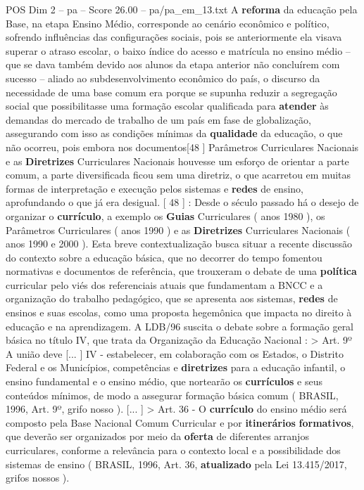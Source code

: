 \begin{textsample}{POS Dim 2 – pa – Score 26.00 – pa/pa\_em\_13.txt}
A \textbf{reforma} da educação pela Base, na etapa Ensino Médio, corresponde ao cenário econômico e político, sofrendo influências das configurações sociais, pois se anteriormente ela visava superar o atraso escolar, o baixo índice do acesso e matrícula no ensino médio – que se dava também devido aos alunos da etapa anterior não concluírem com sucesso – aliado ao subdesenvolvimento econômico do país, o discurso da necessidade de uma base comum era porque se supunha reduzir a segregação social que possibilitasse uma formação escolar qualificada para \textbf{atender} às demandas do mercado de trabalho de um país em fase de globalização, assegurando com isso as condições mínimas da \textbf{qualidade} da educação, o que não ocorreu, pois embora nos documentos[48 ] Parâmetros Curriculares Nacionais e as \textbf{Diretrizes} Curriculares Nacionais houvesse um esforço de orientar a parte comum, a parte diversificada ficou sem uma diretriz, o que acarretou em muitas formas de interpretação e execução pelos sistemas e \textbf{redes} de ensino, aprofundando o que já era desigual. [ 48 ] : Desde o século passado há o desejo de organizar o \textbf{currículo}, a exemplo os \textbf{Guias} Curriculares ( anos 1980 ), os Parâmetros Curriculares ( anos 1990 ) e as \textbf{Diretrizes} Curriculares Nacionais ( anos 1990 e 2000 ).
Esta breve contextualização busca situar a recente discussão do contexto sobre a educação básica, que no decorrer do tempo fomentou normativas e documentos de referência, que trouxeram o debate de uma \textbf{política} curricular pelo viés dos referenciais atuais que fundamentam a BNCC e a organização do trabalho pedagógico, que se apresenta aos sistemas, \textbf{redes} de ensinos e suas escolas, como uma proposta hegemônica que impacta no direito à educação e na aprendizagem.
A LDB/96 suscita o debate sobre a formação geral básica no título IV, que trata da Organização da Educação Nacional : > Art. 9º A união deve [... ] IV - estabelecer, em colaboração com os Estados, o Distrito Federal e os Municípios, competências e \textbf{diretrizes} para a educação infantil, o ensino fundamental e o ensino médio, que nortearão os \textbf{currículos} e seus conteúdos mínimos, de modo a assegurar formação básica comum ( BRASIL, 1996, Art. 9º, grifo nosso ). [... ] > Art. 36 - O \textbf{currículo} do ensino médio será composto pela Base Nacional Comum Curricular e por \textbf{itinerários} \textbf{formativos}, que deverão ser organizados por meio da \textbf{oferta} de diferentes arranjos curriculares, conforme a relevância para o contexto local e a possibilidade dos sistemas de ensino ( BRASIL, 1996, Art. 36, \textbf{atualizado} pela Lei 13.415/2017, grifos nossos ).

\end{textsample}
